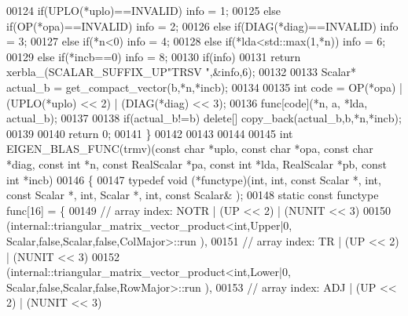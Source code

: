 \begin{DoxyCode}
00124   \textcolor{keywordflow}{if}(UPLO(*uplo)==INVALID)                                            info = 1;
00125   \textcolor{keywordflow}{else} \textcolor{keywordflow}{if}(OP(*opa)==INVALID)                                          info = 2;
00126   \textcolor{keywordflow}{else} \textcolor{keywordflow}{if}(DIAG(*diag)==INVALID)                                       info = 3;
00127   \textcolor{keywordflow}{else} \textcolor{keywordflow}{if}(*n<0)                                                       info = 4;
00128   \textcolor{keywordflow}{else} \textcolor{keywordflow}{if}(*lda<std::max(1,*n))                                        info = 6;
00129   \textcolor{keywordflow}{else} \textcolor{keywordflow}{if}(*incb==0)                                                   info = 8;
00130   \textcolor{keywordflow}{if}(info)
00131     \textcolor{keywordflow}{return} xerbla\_(SCALAR\_SUFFIX\_UP\textcolor{stringliteral}{"TRSV "},&info,6);
00132 
00133   Scalar* actual\_b = get\_compact\_vector(b,*n,*incb);
00134 
00135   \textcolor{keywordtype}{int} code = OP(*opa) | (UPLO(*uplo) << 2) | (DIAG(*diag) << 3);
00136   func[code](*n, a, *lda, actual\_b);
00137 
00138   \textcolor{keywordflow}{if}(actual\_b!=b) \textcolor{keyword}{delete}[] copy\_back(actual\_b,b,*n,*incb);
00139 
00140   \textcolor{keywordflow}{return} 0;
00141 \}
00142 
00143 
00144 
00145 \textcolor{keywordtype}{int} EIGEN\_BLAS\_FUNC(trmv)(\textcolor{keyword}{const} \textcolor{keywordtype}{char} *uplo, \textcolor{keyword}{const} \textcolor{keywordtype}{char} *opa, \textcolor{keyword}{const} \textcolor{keywordtype}{char} *diag, \textcolor{keyword}{const} \textcolor{keywordtype}{int} *n, \textcolor{keyword}{const} 
      RealScalar *pa, \textcolor{keyword}{const} \textcolor{keywordtype}{int} *lda, RealScalar *pb, \textcolor{keyword}{const} \textcolor{keywordtype}{int} *incb)
00146 \{
00147   \textcolor{keyword}{typedef} void (*functype)(int, int, \textcolor{keyword}{const} Scalar *, int, \textcolor{keyword}{const} Scalar *, int, Scalar *, int, \textcolor{keyword}{const} Scalar&
      );
00148   \textcolor{keyword}{static} \textcolor{keyword}{const} functype func[16] = \{
00149     \textcolor{comment}{// array index: NOTR  | (UP << 2) | (NUNIT << 3)}
00150     (internal::triangular\_matrix\_vector\_product<int,Upper|0,       Scalar,false,Scalar,false,ColMajor>::run
      ),
00151     \textcolor{comment}{// array index: TR    | (UP << 2) | (NUNIT << 3)}
00152     (internal::triangular\_matrix\_vector\_product<int,Lower|0,       Scalar,false,Scalar,false,RowMajor>::run
      ),
00153     \textcolor{comment}{// array index: ADJ   | (UP << 2) | (NUNIT << 3)}

\end{DoxyCode}

